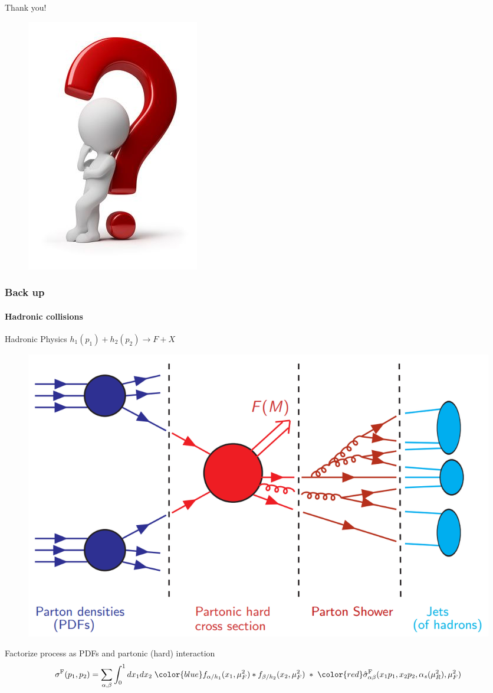 \documentclass[aspectratio=43]{beamer}
\begin{document}
\begin{frame}

	\center \footnotesize {\color{blue}Thank you!}

	\begin{figure}
		\includegraphics[width = 2.5 cm]{plots/thinking.png}
	\end{figure}		

\end{frame}

\begin{frame}
	
	\frametitle{Back up}
	\framesubtitle{Hadronic collisions}
	
	\center \textrm{Hadronic Physics} \footnotesize $h_{1}(p_{1}) + h_{2}(p_{2}) \rightarrow F + X$ 
	
	\begin{figure}
		\includegraphics[width = 7 cm]{plots/section1/factorization_1.png}
	\end{figure}
	
	\center \footnotesize {Factorize process as {\color{blue}PDFs} and {\color{red} partonic (hard) interaction}	
	\begin{equation}
		\sigma^{\textrm{F}}(p_{1}, p_{2}) = \sum_{\alpha, \beta}
		\int_{0}^{1} dx_{1} dx_{2} \; {\color{blue} f_{\alpha/h_{1}}(x_{1}, \mu_{F}^{2}) \ast f_{\beta/h_{2}}(x_{2}, \mu_{F}^{2})}
		\; \ast \;  
		{\color{red}\hat{\sigma}^{\textrm{F}}_{\alpha \beta}(x_{1}p_{1}, x_{2}p_{2}, \alpha_{s}(\mu_{R}^{2}), \mu_{F}^{2})} \nonumber
	\end{equation}}

\end{frame}
\end{document}
